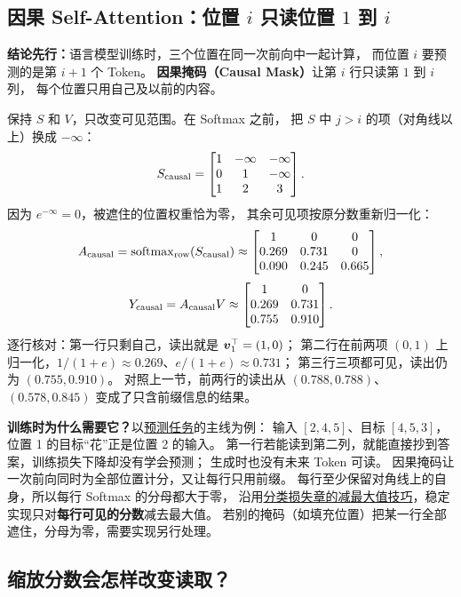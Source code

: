 \subsection{\texorpdfstring{因果 Self-Attention：位置 $i$ 只读位置 $1$ 到 $i$}{因果 Self-Attention：位置 i 只读位置 1 到 i}}
\label{concept:causal-mask}

\textbf{结论先行：}语言模型训练时，三个位置在同一次前向中一起计算，
而位置 $i$ 要预测的是第 $i+1$ 个 Token。
\textbf{因果掩码（Causal Mask）}让第 $i$ 行只读第 $1$ 到 $i$ 列，
每个位置只用自己及以前的内容。

保持 $S$ 和 $V$，只改变可见范围。在 Softmax 之前，
把 $S$ 中 $j>i$ 的项（对角线以上）换成 $-\infty$：
\[
S_{\rm causal}=\begin{bmatrix}
1&-\infty&-\infty\\
0&1&-\infty\\
1&2&3
\end{bmatrix}.
\]
因为 $e^{-\infty}=0$，被遮住的位置权重恰为零，
其余可见项按原分数重新归一化：
\[
A_{\rm causal}=\softmax_{\rm row}(S_{\rm causal})
\approx\boxed{\begin{bmatrix}
1&0&0\\
0.269&0.731&0\\
0.090&0.245&0.665
\end{bmatrix}},
\]
\[
Y_{\rm causal}=A_{\rm causal}V
\approx\boxed{\begin{bmatrix}
1&0\\
0.269&0.731\\
0.755&0.910
\end{bmatrix}}.
\]
逐行核对：第一行只剩自己，读出就是 $\vect v_1^\top=(1,0)$；
第二行在前两项 $(0,1)$ 上归一化，$1/(1+e)\approx0.269$、$e/(1+e)\approx0.731$；
第三行三项都可见，读出仍为 $(0.755,0.910)$。
对照上一节，前两行的读出从 $(0.788,0.788)$、$(0.578,0.845)$
变成了只含前缀信息的结果。

\textbf{训练时为什么需要它？}以\hyperref[intro:language-model-task]{预测任务}的主线为例：
输入 $[2,4,5]$、目标 $[4,5,3]$，位置 1 的目标“花”正是位置 2 的输入。
第一行若能读到第二列，就能直接抄到答案，训练损失下降却没有学会预测；
生成时也没有未来 Token 可读。
因果掩码让一次前向同时为全部位置计分，又让每行只用前缀。
每行至少保留对角线上的自身，所以每行 Softmax 的分母都大于零，
沿用\hyperref[intro:classification-loss]{分类损失章的减最大值技巧}，稳定实现只对\textbf{每行可见的分数}减去最大值。
若别的掩码（如填充位置）把某一行全部遮住，分母为零，需要实现另行处理。


\subsection{缩放分数会怎样改变读取？}

